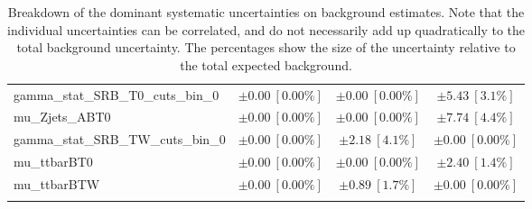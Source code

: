 \begin{table}
\begin{center}
\begin{tabular*}{\textwidth}{@{\extracolsep{\fill}}lccc}
gamma\_stat\_SRB\_T0\_cuts\_bin\_0         & $\pm 0.00\ [0.00\%] $          & $\pm 0.00\ [0.00\%] $          & $\pm 5.43\ [3.1\%] $       \\
mu\_Zjets\_ABT0         & $\pm 0.00\ [0.00\%] $          & $\pm 0.00\ [0.00\%] $          & $\pm 7.74\ [4.4\%] $       \\
gamma\_stat\_SRB\_TW\_cuts\_bin\_0         & $\pm 0.00\ [0.00\%] $          & $\pm 2.18\ [4.1\%] $          & $\pm 0.00\ [0.00\%] $       \\
mu\_ttbarBT0         & $\pm 0.00\ [0.00\%] $          & $\pm 0.00\ [0.00\%] $          & $\pm 2.40\ [1.4\%] $       \\
mu\_ttbarBTW         & $\pm 0.00\ [0.00\%] $          & $\pm 0.89\ [1.7\%] $          & $\pm 0.00\ [0.00\%] $       \\
\noalign{\smallskip}\hline\noalign{\smallskip}
\end{tabular*}
\end{center}
\caption[Breakdown of uncertainty on background estimates]{
Breakdown of the dominant systematic uncertainties on background estimates.
Note that the individual uncertainties can be correlated, and do not necessarily add up quadratically to 
the total background uncertainty. The percentages show the size of the uncertainty relative to the total expected background.
\label{table.results.bkgestimate.uncertainties.SRB_TT_SRB_TW_SRB_T0}}
\end{table}
%